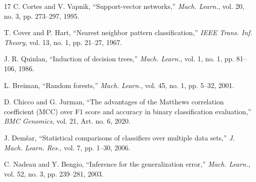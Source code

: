 \begin{thebibliography}{17}
 C. Cortes and V. Vapnik, ``Support-vector networks,'' \textit{Mach. Learn.}, vol. 20, no. 3, pp. 273--297, 1995.

 T. Cover and P. Hart, ``Nearest neighbor pattern classification,'' \textit{IEEE Trans. Inf. Theory}, vol. 13, no. 1, pp. 21--27, 1967.

 J. R. Quinlan, ``Induction of decision trees,'' \textit{Mach. Learn.}, vol. 1, no. 1, pp. 81--106, 1986.

 L. Breiman, ``Random forests,'' \textit{Mach. Learn.}, vol. 45, no. 1, pp. 5--32, 2001.

 D. Chicco and G. Jurman, ``The advantages of the Matthews correlation coefficient (MCC) over F1 score and accuracy in binary classification evaluation,'' \textit{BMC Genomics}, vol. 21, Art. no. 6, 2020.

 J. Dem\v{s}ar, ``Statistical comparisons of classifiers over multiple data sets,'' \textit{J. Mach. Learn. Res.}, vol. 7, pp. 1--30, 2006.

 C. Nadeau and Y. Bengio, ``Inference for the generalization error,'' \textit{Mach. Learn.}, vol. 52, no. 3, pp. 239--281, 2003.
\end{thebibliography}
